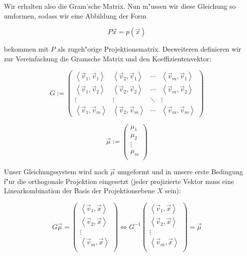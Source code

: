 \documentclass{article}
\newcommand{\lrangle}[1]{\left\langle #1 \right\rangle}
\begin{document}
Wir erhalten also die Gram'sche Matrix.
Nun m"ussen wir diese Gleichung so umformen, sodass wir eine Abbildung der Form

	\begin{equation}
		P\vec{x}=p(\vec{x})
	\end{equation}

bekommen mit \(P\) als zugeh"orige Projektionsmatrix.
Desweiteren definieren wir zur Vereinfachung die Gramsche Matrix und den Koeffizientenvektor:

	\begin{equation}
		G :=
		\begin{pmatrix}
			\lrangle{ \vec{v}_1, \vec{v}_1 } &
			\lrangle{ \vec{v}_2, \vec{v}_1 } &
			\cdots &
			\lrangle{ \vec{v}_m, \vec{v}_1 } \\
			\lrangle{ \vec{v}_1, \vec{v}_2 } &
			\lrangle{ \vec{v}_2, \vec{v}_2 } &
			\cdots &
			\lrangle{ \vec{v}_m, \vec{v}_2 } \\
			\vdots & \vdots & \ddots & \vdots \\
			\lrangle{ \vec{v}_1, \vec{v}_m } &
			\lrangle{ \vec{v}_2, \vec{v}_m } &
			\cdots &
			\lrangle{ \vec{v}_m, \vec{v}_m }
		\end{pmatrix}
	\end{equation}

	\begin{equation}
		\vec{\mu} :=
		\begin{pmatrix}
			\mu _1 \\
			\mu _2 \\
			\vdots \\
			\mu _m \\
		\end{pmatrix}
	\end{equation}

Unser Gleichungssystem wird nach \( \vec{\mu} \) umgeformt und in unsere erste Bedingung f"ur die
orthogonale Projektion eingesetzt (jeder projizierte Vektor muss eine Linearkombination der Basis
der Projektionsebene \(X\) sein):

	\begin{equation}
		G \vec{\mu} =
		\begin{pmatrix}
			\lrangle{ \vec{v}_1, \vec{x} } \\
			\lrangle{ \vec{v}_2, \vec{x} } \\
			\vdots \\
			\lrangle{ \vec{v}_m, \vec{x} } \\
		\end{pmatrix}
		\iff G^{-1}
		\begin{pmatrix}
			\lrangle{ \vec{v}_1, \vec{x} } \\
			\lrangle{ \vec{v}_2, \vec{x} } \\
			\vdots \\
			\lrangle{ \vec{v}_m, \vec{x} } \\
		\end{pmatrix} = \vec{\mu}
	\end{equation}
\end{document}
